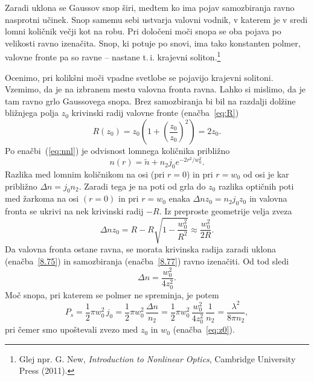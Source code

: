 Zaradi uklona se Gaussov snop širi, medtem ko ima pojav samozbiranja ravno nasprotni
učinek. Snop samemu sebi ustvarja valovni vodnik, v katerem je v sredi lomni količnik 
večji kot na robu. Pri določeni moči snopa se oba pojava po
velikosti ravno izenačita. Snop, ki potuje po snovi, ima tako konstanten polmer, 
valovne fronte pa so ravne -- nastane t.\,i. krajevni soliton.\footnote{Glej npr. G. New, {\it Introduction
to Nonlinear Optics}, Cambridge University Press (2011).}

Ocenimo, pri kolikšni moči vpadne svetlobe se pojavijo krajevni solitoni. 
Vzemimo, da je na izbranem mestu valovna fronta ravna. Lahko si mislimo,
da je tam ravno grlo Gaussovega snopa. Brez samozbiranja bi bil na razdalji
dolžine bližnjega polja $z_{0}$ krivinski radij valovne fronte (enačba~\ref{eq:R})
\begin{equation}
R(z_{0})=z_{0}\left( 1+\left(\frac{z_{0}}{z_{0}}\right)^{2}\right)=2z_{0}.
\label{8.75}
\end{equation}
Po enačbi~(\ref{eq:nnl}) je odvisnost lomnega količnika približno
\begin{equation}
n(r)=\tilde{n}+n_2 j_0 e^{-2r^2/w_0^2}.
\label{8.76}
\end{equation}
Razlika med lomnim količnikom na osi (pri $r=0$) in pri $r = w_{0}$ 
od osi je kar približno $\Delta n= j_{0} n_{2}$.
Zaradi tega je na poti od grla do $z_0$ razlika optičnih poti med žarkoma na osi $(r=0)$ in 
pri $r= w_{0}$ enaka $\Delta nz_{0} = n_2 j_0 z_0$ in valovna fronta se 
ukrivi na nek krivinski radij $-R$. Iz preproste geometrije velja zveza 
\begin{equation}
\Delta nz_{0}=R-R\sqrt{1-\frac{w_{0}^{2}}{R^{2}}}\approx \frac{w_{0}^{2}}{2R}.
\label{8.77}
\end{equation}
Da valovna fronta ostane ravna, se morata krivinska radija zaradi uklona 
(enačba~\ref{8.75}) in samozbiranja (enačba~\ref{8.77}) ravno izenačiti. 
Od tod sledi 
\begin{equation}
\Delta n=\frac{w_{0}^{2}}{4z_{0}^{2}}.
\label{8.78}
\end{equation}
Moč snopa, pri katerem se polmer ne spreminja, je potem 
\begin{equation}
P_{s}= \frac{1}{2}\pi w_0^2 \,j_0 = \frac{1}{2}\pi w_0^2 \, \frac{\Delta n}{n_2} = 
\frac{1}{2}\pi w_0^2 \,\frac{w_{0}^{2}}{4z_{0}^{2}}\,\frac{1}{n_2} = \frac{\lambda^2}{8\pi n_2},
\label{8.79}
\end{equation}
pri čemer smo upoštevali zvezo med $z_0$ in $w_0$ (enačba~\ref{eq:z0}).

